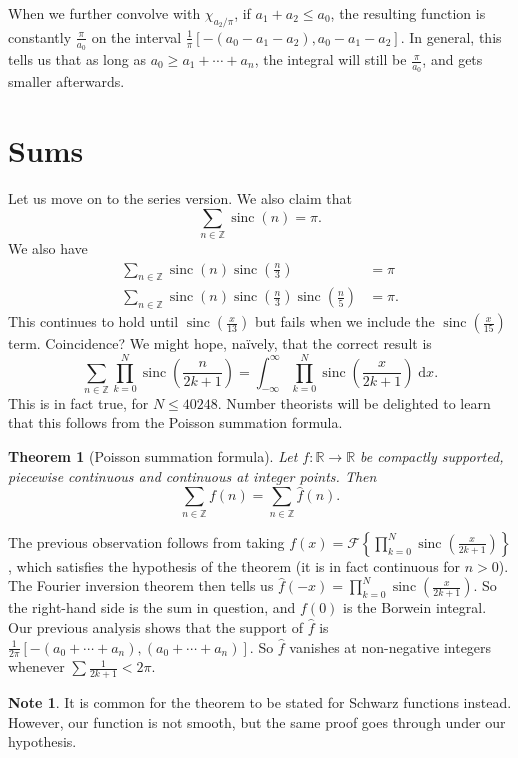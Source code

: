 \documentclass{shortart}
\newtheorem{thm}{Theorem}[section]
\theoremstyle{definition}
\newtheorem*{note}{Note}
\newcommand\Z{\mathbb{Z}}
\newcommand\R{\mathbb{R}}
\DeclareMathOperator\sinc{sinc}
\renewcommand\d{\mathrm{d}}
\begin{document}
When we further convolve with $\chi_{a_2/\pi}$, if $a_1 + a_2 \leq a_0$, the resulting function is constantly $\frac{\pi}{a_0}$ on the interval $\frac{1}{\pi}[-(a_0 - a_1 - a_2), a_0 - a_1 - a_2]$. In general, this tells us that as long as $a_0 \geq a_1 + \cdots + a_n$, the integral will still be $\frac{\pi}{a_0}$, and gets smaller afterwards.

\section{Sums}
Let us move on to the series version. We also claim that
\[
  \sum_{n \in \Z} \sinc(n) = \pi.
\]
We also have
\[
  \begin{aligned}
    \sum_{n \in \Z} \sinc(n) \sinc\left(\frac{n}{3}\right) &= \pi\\
    \sum_{n \in \Z} \sinc(n) \sinc\left(\frac{n}{3}\right)\sinc\left(\frac{n}{5}\right) &= \pi.
  \end{aligned}
\]
This continues to hold until $\sinc (\frac{x}{13})$ but fails when we include the $\sinc \left(\frac{x}{15}\right)$ term. Coincidence? We might hope, na\"ively, that the correct result is
\[
  \sum_{n \in \Z} \prod_{k = 0}^N \sinc \left(\frac{n}{2k + 1}\right) = \int_{-\infty}^\infty \prod_{k = 0}^N \sinc\left(\frac{x}{2k + 1}\right) \;\d x.
\]
This is in fact true, for $N\leq 40248$. Number theorists will be delighted to learn that this follows from the Poisson summation formula.

\begin{thm}[Poisson summation formula]
  Let $f: \R \to \R$ be compactly supported, piecewise continuous and continuous at integer points. Then
  \[
    \sum_{n \in \Z} f(n) = \sum_{n \in \Z} \hat{f}(n).
  \]
\end{thm}

The previous observation follows from taking $f(x) = \mathcal{F}\left\{\prod_{k = 0}^N \sinc \left(\frac{x}{2k + 1}\right)\right\}$, which satisfies the hypothesis of the theorem (it is in fact continuous for $n > 0$). The Fourier inversion theorem then tells us $\hat{f}(-x) = \prod_{k = 0}^N \sinc \left(\frac{x}{2k + 1}\right)$. So the right-hand side is the sum in question, and $f(0)$ is the Borwein integral. Our previous analysis shows that the support of $\hat{f}$  is $\frac{1}{2\pi}[-(a_0 + \cdots + a_n), (a_0 + \cdots + a_n)]$. So $\hat{f}$ vanishes at non-negative integers whenever $\sum \frac{1}{2k + 1} < 2\pi$.

\begin{note}
  It is common for the theorem to be stated for Schwarz functions instead. However, our function is not smooth, but the same proof goes through under our hypothesis.
\end{note}
\end{document}
